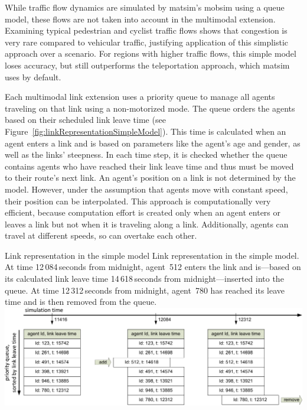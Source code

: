 While traffic flow dynamics are simulated by \gls{matsim}'s \gls{mobsim} using a queue model, these flows are not taken into account in the \gls{multimodal} extension. Examining typical pedestrian and cyclist traffic flows shows that congestion is very rare compared to vehicular traffic, justifying application of this simplistic approach over a scenario. For regions with higher traffic flows, this simple model loses accuracy, but still outperforms the \gls{teleportation} approach, which \gls{matsim} uses by default.

Each \gls{multimodal} link extension uses a priority queue to manage all agents traveling on that link using a non-motorized mode. The queue orders the agents based on their scheduled link leave time (see Figure~\ref{fig:linkRepresentationSimpleModel}). This time is calculated when an agent enters a link and is based on parameters like the agent's age and gender, as well as the links' steepness. In each time step, it is checked whether the queue contains agents who have reached their link leave time and thus must be moved to their route's next link. An agent's position on a link is not determined by the model. However, under the assumption that agents move with constant speed, their position can be interpolated. This approach is computationally very efficient, because computation effort is created only when an agent enters or leaves a link but not when it is traveling along a link. Additionally, agents can travel at different speeds, so can overtake each other.

\createfigure%
{Link representation in the simple model}%
{Link representation in the simple model. \\At time 12\,084\,seconds from midnight, agent~512 enters the link and is---based on its calculated link leave time 14\,618\,seconds from midnight---inserted into the queue. At time 12\,312\,seconds from midnight, agent~780 has reached its leave time and is then removed from the queue.}%
{\label{fig:linkRepresentationSimpleModel}}%
{\includegraphics[width=1.0\textwidth, angle=0]{extending/figures/MultiModalSimulation/linkRepresentation}}%
{}


